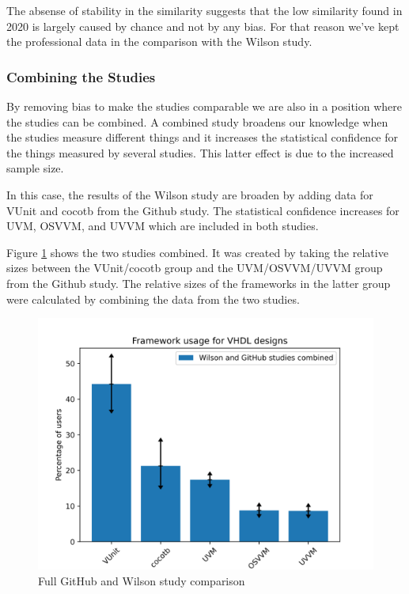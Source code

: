 \documentclass[]{article}
\begin{document}
The absense of stability in the similarity suggests that the low similarity found in 2020 is largely caused by chance and not by any bias. For that reason we've kept the professional data in the comparison with the Wilson study.

\hypertarget{combining-the-studies}{%
\subsubsection{Combining the Studies}\label{combining-the-studies}}

By removing bias to make the studies comparable we are also in a position where the studies can be combined. A combined study broadens our knowledge when the studies measure different things and it increases the statistical confidence for the things measured by several studies. This latter effect is due to the increased sample size.

In this case, the results of the Wilson study are broaden by adding data for VUnit and cocotb from the Github study. The statistical confidence increases for UVM, OSVVM, and UVVM which are included in both studies.

Figure \ref{fig:github-wilson-full-combined-comparison} shows the two studies combined. It was created by taking the relative sizes between the VUnit/cocotb group and the UVM/OSVVM/UVVM group from the Github study. The relative sizes of the frameworks in the latter group were calculated by combining the data from the two studies.

\begin{figure}

{\centering \includegraphics[width=0.85\linewidth]{img/github_wilson_full_combined_comparison} 

}

\caption{Full GitHub and Wilson study comparison}\label{fig:github-wilson-full-combined-comparison}
\end{figure}
\end{document}
